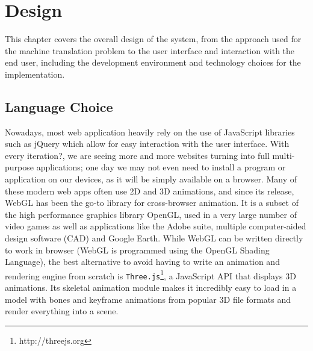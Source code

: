 \documentclass[12pt]{ociamthesis}  %
\begin{document}


\chapter{Design}

This chapter covers the overall design of the system, from the approach used for the machine translation problem to the user interface and interaction with the end user, including the development environment and technology choices for the implementation.


\section{Language Choice}
Nowadays, most web application heavily rely on the use of JavaScript libraries such as jQuery which allow for easy interaction with the user interface. With every iteration?, we are seeing more and more websites turning into full multi-purpose applications; one day we may not even need to install a program or application on our devices, as it will be simply available on a browser. Many of these modern web apps often use 2D and 3D animations, and since its release, WebGL has been the go-to library for cross-browser animation. It is a subset of the high performance graphics library OpenGL, used in a very large number of video games as well as applications like the Adobe suite, multiple computer-aided design software (CAD) and Google Earth. While WebGL can be written directly to work in browser (WebGL is programmed using the OpenGL Shading Language), the best alternative to avoid having to write an animation and rendering engine from scratch is \texttt{Three.js}\footnote{http://threejs.org}, a JavaScript API that displays 3D animations. Its skeletal animation module makes it incredibly easy to load in a model with bones and keyframe animations from popular 3D file formats and render everything into a scene. 
\end{document}
